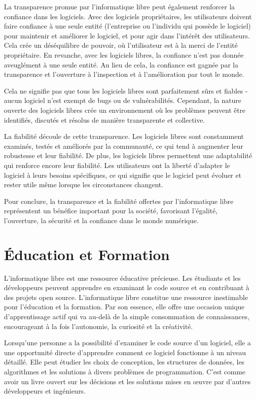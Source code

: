 La transparence promue par l'informatique libre peut également renforcer la confiance dans les logiciels. Avec des logiciels propriétaires, les utilisateurs doivent faire confiance à une seule entité (l'entreprise ou l'individu qui possède le logiciel) pour maintenir et améliorer le logiciel, et pour agir dans l'intérêt des utilisateurs. Cela crée un déséquilibre de pouvoir, où l'utilisateur est à la merci de l'entité propriétaire. En revanche, avec les logiciels libres, la confiance n'est pas donnée aveuglément à une seule entité. Au lieu de cela, la confiance est gagnée par la transparence et l'ouverture à l'inspection et à l'amélioration par tout le monde.

Cela ne signifie pas que tous les logiciels libres sont parfaitement sûrs et fiables - aucun logiciel n'est exempt de bugs ou de vulnérabilités. Cependant, la nature ouverte des logiciels libres crée un environnement où les problèmes peuvent être identifiés, discutés et résolus de manière transparente et collective.

La fiabilité découle de cette transparence. Les logiciels libres sont constamment examinés, testés et améliorés par la communauté, ce qui tend à augmenter leur robustesse et leur fiabilité. De plus, les logiciels libres permettent une adaptabilité qui renforce encore leur fiabilité. Les utilisateurs ont la liberté d'adapter le logiciel à leurs besoins spécifiques, ce qui signifie que le logiciel peut évoluer et rester utile même lorsque les circonstances changent.

Pour conclure, la transparence et la fiabilité offertes par l'informatique libre représentent un bénéfice important pour la société, favorisant l'égalité, l'ouverture, la sécurité et la confiance dans le monde numérique.

\section{Éducation et Formation}
L'informatique libre est une ressource éducative précieuse. Les étudiants et les développeurs peuvent apprendre en examinant le code source et en contribuant à des projets open source.
L'informatique libre constitue une ressource inestimable pour l'éducation et la formation. Par son essence, elle offre une occasion unique d'apprentissage actif qui va au-delà de la simple consommation de connaissances, encourageant à la fois l'autonomie, la curiosité et la créativité.

Lorsqu'une personne a la possibilité d'examiner le code source d'un logiciel, elle a une opportunité directe d'apprendre comment ce logiciel fonctionne à un niveau détaillé. Elle peut étudier les choix de conception, les structures de données, les algorithmes et les solutions à divers problèmes de programmation. C'est comme avoir un livre ouvert sur les décisions et les solutions mises en œuvre par d'autres développeurs et ingénieurs.

